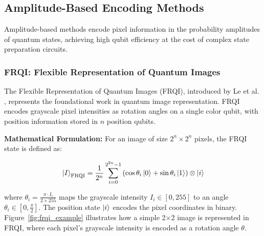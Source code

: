\documentclass[11pt,a4paper]{article}
\begin{document}
\subsection{Amplitude-Based Encoding Methods}

Amplitude-based methods encode pixel information in the probability amplitudes of quantum states, achieving high qubit efficiency at the cost of complex state preparation circuits.

\subsubsection{FRQI: Flexible Representation of Quantum Images}

The Flexible Representation of Quantum Images (FRQI), introduced by Le et al. \cite{ref3}, represents the foundational work in quantum image representation. FRQI encodes grayscale pixel intensities as rotation angles on a single color qubit, with position information stored in $n$ position qubits.

\textbf{Mathematical Formulation:}
For an image of size $2^n \times 2^n$ pixels, the FRQI state is defined as:

\begin{equation}
\ket{I}_{\text{FRQI}} = \frac{1}{2^n} \sum_{i=0}^{2^{2n}-1} \left(\cos\theta_i\ket{0} + \sin\theta_i\ket{1}\right) \otimes \ket{i}
\label{eq:frqi_state}
\end{equation}

where $\theta_i = \frac{\pi \cdot I_i}{2 \times 255}$ maps the grayscale intensity $I_i \in [0, 255]$ to an angle $\theta_i \in [0, \frac{\pi}{2}]$. The position state $\ket{i}$ encodes the pixel coordinates in binary.
Figure~\ref{fig:frqi_example} illustrates how a simple 2×2 image is represented in FRQI, where each pixel's grayscale intensity is encoded as a rotation angle $\theta$.
\end{document}
